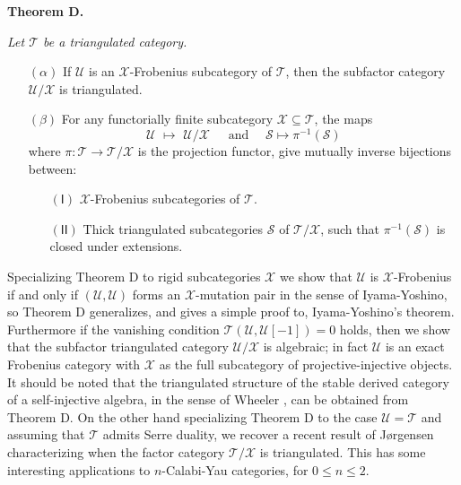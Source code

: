 \documentclass[oneside, a4paper,reqno]{amsart}
\numberwithin{equation}{section}
\theoremstyle{definition}
\begin{document}
 {\bf Theorem D.} {\em  Let ${\mathcal T}$ be a triangulated category. 
 \begin{enumerate} 
 \item[$(\alpha)$] If ${\mathcal U}$ is an ${\mathcal X}$-Frobenius subcategory of ${\mathcal T}$, then the subfactor category ${\mathcal U}/{\mathcal X}$ is triangulated.

 
 \item[$(\beta)$] For any functorially finite subcategory ${\mathcal X} \subseteq {\mathcal T}$,  the maps 
\[
{\mathcal U} \,\, \longmapsto \,\, {\mathcal U}/{\mathcal X} \,\,\,\,\,\,\,\,\, \text{and} \,\,\,\,\,\,\,\, \mathcal S \longmapsto   \pi^{-1}(\mathcal S)
\]
where $\pi \colon {\mathcal T} {\longrightarrow} {\mathcal T}/{\mathcal X}$ is the projection functor, give mutually inverse bijections between:
\begin{enumerate}
\item[$\mathsf{(I)}$] ${\mathcal X}$-Frobenius subcategories of ${\mathcal T}$.  
\item[$\mathsf{(II)}$] Thick triangulated subcategories $\mathcal S$ of ${\mathcal T}/{\mathcal X}$, such that $\pi^{-1}(\mathcal S)$ is closed under extensions. 
\end{enumerate} 
\end{enumerate}
}

\medskip

 
Specializing Theorem D to rigid subcategories ${\mathcal X}$ we show that  ${\mathcal U}$ is ${\mathcal X}$-Frobenius if and only if $({\mathcal U},{\mathcal U})$ forms an ${\mathcal X}$-mutation pair in the sense of Iyama-Yoshino, so  Theorem D  generalizes, and gives a simple proof to, Iyama-Yoshino's theorem.  Furthermore   if the vanishing condition ${\mathcal T}({\mathcal U},{\mathcal U}[-1]) = 0$ holds, then we show that the subfactor triangulated category ${\mathcal U}/{\mathcal X}$ is algebraic; in fact  ${\mathcal U}$ is an exact Frobenius category with ${\mathcal X}$ as the full subcategory of projective-injective objects. It should be noted that  the triangulated structure of the stable derived category of a self-injective algebra, in the sense of Wheeler \cite{Wheeler}, can be obtained from Theorem D. On the other hand specializing Theorem D to the case ${\mathcal U} = {\mathcal T}$ and assuming that ${\mathcal T}$ admits Serre duality, we recover a recent result of J{\o}rgensen \cite{PJ}  characterizing when the factor category ${\mathcal T}/{\mathcal X}$ is triangulated. This has some interesting applications to $n$-Calabi-Yau categories, for $ 0 \leq n\leq  2$.  
\end{document}
